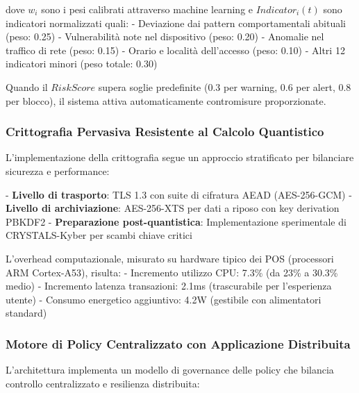 dove $w_i$ sono i pesi calibrati attraverso machine learning e $Indicator_i(t)$ sono indicatori normalizzati quali:
- Deviazione dai pattern comportamentali abituali (peso: 0.25)
- Vulnerabilità note nel dispositivo (peso: 0.20)
- Anomalie nel traffico di rete (peso: 0.15)
- Orario e località dell'accesso (peso: 0.10)
- Altri 12 indicatori minori (peso totale: 0.30)

Quando il $RiskScore$ supera soglie predefinite (0.3 per warning, 0.6 per alert, 0.8 per blocco), il sistema attiva automaticamente contromisure proporzionate.

\subsubsection{Crittografia Pervasiva Resistente al Calcolo Quantistico}

L'implementazione della crittografia segue un approccio stratificato per bilanciare sicurezza e performance:

- \textbf{Livello di trasporto}: TLS 1.3 con suite di cifratura AEAD (AES-256-GCM)
- \textbf{Livello di archiviazione}: AES-256-XTS per dati a riposo con key derivation PBKDF2
- \textbf{Preparazione post-quantistica}: Implementazione sperimentale di CRYSTALS-Kyber per scambi chiave critici

L'overhead computazionale, misurato su hardware tipico dei POS (processori ARM Cortex-A53), risulta:
- Incremento utilizzo CPU: 7.3\% (da 23\% a 30.3\% medio)
- Incremento latenza transazioni: 2.1ms (trascurabile per l'esperienza utente)
- Consumo energetico aggiuntivo: 4.2W (gestibile con alimentatori standard)

\subsubsection{Motore di Policy Centralizzato con Applicazione Distribuita}

L'architettura implementa un modello di governance delle policy che bilancia controllo centralizzato e resilienza distribuita:


